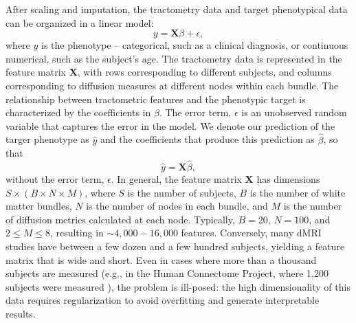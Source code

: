 \documentclass[10pt,%
               aps,%
               prl,%
               preprint,%
               superscriptaddress,%
               preprintnumbers,%
               amsmath,%
               floatfix,%
               endfloats*]{revtex4-2}
\begin{document}
After scaling and imputation, the tractometry data and target
phenotypical data can be organized in a linear model:
\begin{equation}
    y = \mathbf{X} \beta + \epsilon,
    \label{eq:lm}
\end{equation}
where $y$ is the phenotype -- categorical, such as a clinical diagnosis,
or continuous numerical, such as the subject's age. The tractometry
data is represented in the feature matrix $\mathbf{X}$, with rows
corresponding to different subjects, and columns corresponding
to diffusion measures at different nodes within each bundle. The
relationship between tractometric features and the phenotypic target is
characterized by the coefficients in $\beta$. The error term, $\epsilon$
is an unobserved random variable that captures the error in the model.
We denote our prediction of the targer phenotype as $\hat{y}$ and the
coefficients that produce this prediction as $\hat{\beta}$, so that
\begin{equation}
    \hat{y} = \mathbf{X} \hat{\beta},
    \label{eq:lm-approx}
\end{equation}
without the error term, $\epsilon$. In general, the feature matrix
$\mathbf{X}$ has dimensions $S \times (B \times N \times M)$, where $S$
is the number of subjects, $B$ is the number of white matter bundles,
$N$ is the number of nodes in each bundle, and $M$ is the number of
diffusion metrics calculated at each node. Typically, $B = 20$, $N =
100$, and $2 \le M \le 8$, resulting in $\sim 4,000 - 16,000$ features.
Conversely, many dMRI studies have between a few dozen and a few
hundred subjects, yielding a feature matrix that is wide and short.
Even in cases where more than a thousand subjects are measured (e.g.,
in the Human Connectome Project, where 1,200 subjects were measured
\cite{VanEssen2012}), the problem is ill-posed: the high dimensionality
of this data requires regularization to avoid overfitting and generate
interpretable results.
\end{document}

